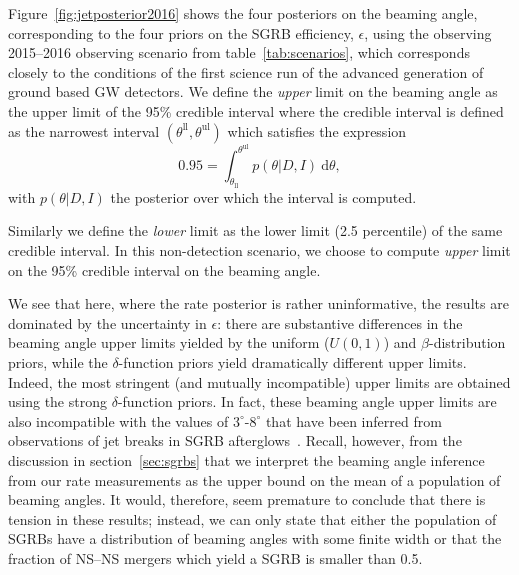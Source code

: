 \documentclass[twocolumn]{aastex61}
\newcommand{\diff}{{\mathrm d}}
\newcommand{\BNS}{\ac{NS}--\ac{NS}\xspace}
\begin{document}
Figure~\ref{fig:jetposterior2016} shows the four posteriors on the
beaming angle, corresponding to the four priors on the \ac{SGRB}
efficiency, $\epsilon$, using the observing 2015--2016 observing
scenario from table~\ref{tab:scenarios}, which corresponds closely
to the conditions of the first science run of the advanced generation
of ground based \ac{GW} detectors.  We define the \emph{upper} limit
on the beaming angle as the upper limit of the 95\% credible interval
where the credible interval is defined as the narrowest interval
$(\theta^{\mathrm{ll}}, \theta^{\mathrm{ul}})$ which satisfies the expression
\begin{equation}
    \label{eq:beaming_upper_limit}
    0.95 = \int_{\theta_{\mathrm{ll}}}^{\theta^{\mathrm{ul}}} p(\theta|D,I)~\diff \theta,
\end{equation}
with $p(\theta|D,I)$ the posterior over which the interval is
computed.

Similarly we define the \emph{lower} limit as the lower
limit (2.5 percentile) of the same credible interval.  In this
non-detection scenario, we choose to compute \emph{upper} limit on the
95\% credible interval on the beaming angle.

We see that here, where the rate posterior is rather uninformative,
the results are dominated by the uncertainty in $\epsilon$: there are
substantive differences in the beaming angle upper limits yielded by
the uniform ($U(0,1)$) and $\beta$-distribution priors, while the
$\delta$-function priors yield dramatically different upper limits.
Indeed, the most stringent (and mutually incompatible) upper limits
are obtained using the strong $\delta$-function priors.  In fact,
these beaming angle upper limits are also incompatible with the values
of $3^{\circ}\mbox{-}8^{\circ}$ that have been inferred from
observations of jet breaks in \ac{SGRB}
afterglows~\cite{Fong:2013lba,2006MNRAS.367L..42P,
  2012A&A...538L...7N}.  Recall, however, from the discussion in
section~\ref{sec:sgrbs} that we interpret the beaming angle inference
from our rate measurements as the upper bound on the mean of a
population of beaming angles.  It would, therefore, seem premature to
conclude that there is tension in these results; instead, we can only
state that either the population of \acp{SGRB} have a distribution of
beaming angles with some finite width or that the fraction of \BNS
mergers which yield a \ac{SGRB} is smaller than 0.5.
\end{document}
